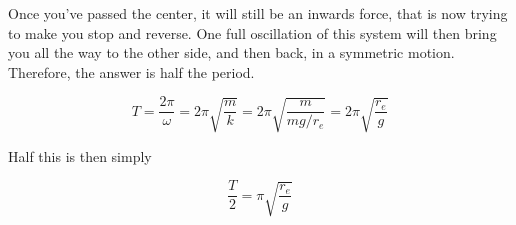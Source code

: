 \documentclass[8.01x]{subfiles}
\begin{document}
Once you've passed the center, it will still be an inwards force, that is now trying to make you stop and reverse. One full oscillation of this system will then bring you all the way to the other side, and then back, in a symmetric motion. Therefore, the answer is half the period.

\begin{equation}
T = \frac{2 \pi}{\omega} = 2\pi \sqrt{\frac{m}{k}} = 2\pi \sqrt{\frac{m}{mg/r_e}} = 2 \pi \sqrt{\frac{r_e}{g}}
\end{equation}

Half this is then simply

\begin{equation}
\frac{T}{2} = \pi\sqrt{\frac{r_e}{g}}
\end{equation}
\end{document}
